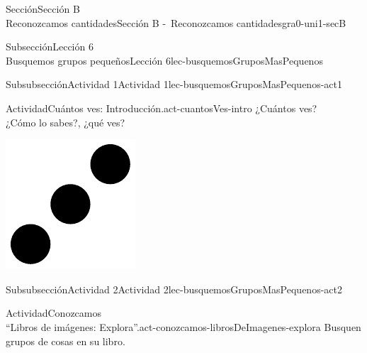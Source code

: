 \begin{sectionptx}{Sección}{{\Large Sección B\\}Reconozcamos cantidades}{}{Sección B -~Reconozcamos cantidades}{}{}{gra0-uni1-secB}
\begin{subsectionptx}{Subsección}{{\normalsize Lección 6\\[-0.05cm]}Busquemos grupos pequeños}{}{Lección 6}{}{}{lec-busquemosGruposMasPequenos}
%
\clearpage
\begin{subsubsectionptx}{Subsubsección}{Actividad 1}{}{Actividad 1}{}{}{lec-busquemosGruposMasPequenos-act1}
\begin{activity}{Actividad}{Cuántos ves: Introducción.}{act-cuantosVes-intro}%
¿Cuántos ves?\\
 ¿Cómo lo sabes?, ¿qué ves?%
\begin{image}{0}{1}{0}{}%
\includegraphics[max width=\linewidth, center]{external/svg-source/tikz-file-148150.pdf}
\end{image}%
\end{activity}%
\end{subsubsectionptx}
%
%
\typeout{************************************************}
\typeout{************************************************}
%
\begin{subsubsectionptx}{Subsubsección}{Actividad 2}{}{Actividad 2}{}{}{lec-busquemosGruposMasPequenos-act2}
\begin{activity}{Actividad}{Conozcamos\\“Libros de imágenes: Explora”.}{act-conozcamos-librosDeImagenes-explora}%
Busquen grupos de cosas en su libro.%
\end{activity}%

\end{subsubsectionptx}
\end{subsectionptx}
\end{sectionptx}
